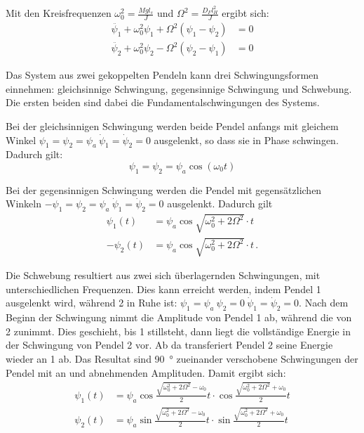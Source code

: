 \documentclass[
12pt,
a4paper,
bibliography=totocnumbered, %
twoside, %
BCOR=1cm, %
]{scrartcl}
\begin{document}
Mit den Kreisfrequenzen \(\omega_0^2=\frac{Mgl_s}{J}\)  und  \(\Omega^2=\frac{D_Fl_H^2}{J}\) ergibt sich:
\begin{align}
	\ddot{\psi_1}+\omega_0^2\psi_1+\Omega^2(\psi_1-\psi_2) &= 0\\
	\ddot{\psi_2}+\omega_0^2\psi_2-\Omega^2(\psi_2-\psi_1) &= 0
\end{align}

Das System aus zwei gekoppelten Pendeln kann drei Schwingungsformen einnehmen: gleichsinnige Schwingung, gegensinnige Schwingung und Schwebung. Die ersten beiden sind dabei die Fundamentalschwingungen des Systems.

Bei der gleichsinnigen Schwingung werden beide Pendel anfangs mit gleichem Winkel \(\psi_1 =\psi_2=\psi_a \ \dot\psi_1=\dot\psi_2=0\) ausgelenkt, so dass sie in Phase schwingen. Dadurch gilt:
\begin{equation}
	\psi_1 =\psi_2=\psi_a \cos(\omega_0t)
\end{equation}

Bei der gegensinnigen Schwingung werden die Pendel mit gegensätzlichen Winkeln \(-\psi_1=\psi_2=\psi_a \ \dot\psi_1=\dot\psi_2=0\) ausgelenkt. Dadurch gilt
\begin{align}
	\psi_1(t) &=\psi_a \cos\sqrt{\omega_0^2+2\Omega^2}\cdot t\\
	-\psi_2(t) &=\psi_a \cos\sqrt{\omega_0^2+2\Omega^2}\cdot t \,.
\end{align}

Die Schwebung resultiert aus zwei sich überlagernden Schwingungen, mit unterschiedlichen Frequenzen. Dies kann erreicht werden, indem Pendel 1 ausgelenkt wird, während 2 in Ruhe ist: \(\psi_1=\psi_a \ \psi_2=0 \ \dot\psi_1=\dot\psi_2=0\). Nach dem Beginn der Schwingung nimmt die Amplitude von Pendel 1 ab, während die von 2 zunimmt. Dies geschieht, bis 1 stillsteht, dann liegt die vollständige Energie in der Schwingung von Pendel 2 vor. Ab da transferiert Pendel 2 seine Energie wieder an 1 ab. Das Resultat sind \qty{90}{\degree} zueinander verschobene Schwingungen der Pendel mit an und abnehmenden Amplituden. Damit ergibt sich:
\begin{align}
	\psi_1(t) &= \psi_a\cos\frac{\sqrt{\omega_0^2+2\Omega^2}-\omega_0}{2}t\cdot\cos\frac{\sqrt{\omega_0^2+2\Omega^2}+\omega_0}{2}t\\
	\psi_2(t) &= \psi_a\sin\frac{\sqrt{\omega_0^2+2\Omega^2}-\omega_0}{2}t\cdot\sin\frac{\sqrt{\omega_0^2+2\Omega^2}+\omega_0}{2}t
\end{align}
\end{document}
